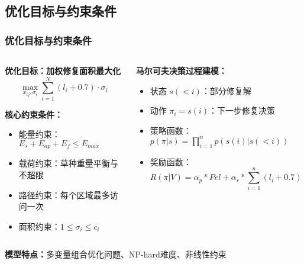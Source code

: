 \documentclass[11pt, aspectratio=169]{beamer}  %
\begin{document}
\subsection{优化目标与约束条件}
\begin{frame}
	\frametitle{优化目标与约束条件}
	\begin{columns}
		\begin{column}{0.5\textwidth}
			\textbf{优化目标：加权修复面积最大化}
			\begin{equation*}
				\max_{x_{ij}, \sigma_i} \sum_{i=1}^{N} (l_i + 0.7) \cdot \sigma_i
			\end{equation*}

			\textbf{核心约束条件：}
			\begin{itemize}
				\item 能量约束：$E_s + E_{ap} + E_f \leq E_{max}$
				\item 载荷约束：草种重量平衡与不超限
				\item 路径约束：每个区域最多访问一次
				\item 面积约束：$1 \leq \sigma_i \leq c_i$
			\end{itemize}
		\end{column}
		\begin{column}{0.5\textwidth}
			\textbf{马尔可夫决策过程建模：}
			\begin{itemize}
				\item 状态 $s(<i)$：部分修复解
				\item 动作 $\pi_i=s(i)$：下一步修复决策
				\item 策略函数：$p(\pi|s)=\prod_{i=1}^n p(s(i)|s(<i))$
				\item 奖励函数：
				      \begin{equation*}
					      R(\pi|V)=\alpha_{p}*Pel+\alpha_{r}*\sum_{i=1}^{n}(l_i+0.7)*a_{i}
				      \end{equation*}
			\end{itemize}
		\end{column}
	\end{columns}
	\vspace{0.3cm}
	\textbf{模型特点：}多变量组合优化问题、NP-hard难度、非线性约束
\end{frame}
\end{document}
